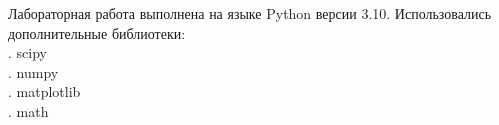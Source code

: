 \documentclass[../main.tex]{subfiles}
\begin{document}
    \noindent Лабораторная работа выполнена на языке Python версии 3.10. 
    \newline Использовались дополнительные библиотеки:\\
        . scipy\\
        . numpy\\
        . matplotlib\\
        . math\\
\end{document}

